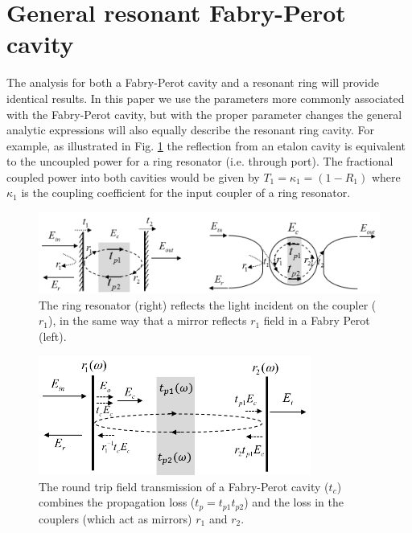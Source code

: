 \documentclass[10pt]{article}
\begin{document}
\section{General resonant Fabry-Perot cavity}
The analysis for both a Fabry-Perot cavity and a resonant ring will provide identical results.  In this paper we use the parameters more commonly associated with the Fabry-Perot cavity, but with the proper parameter changes the general analytic expressions will also equally describe the resonant ring cavity. For example, as illustrated in Fig. \ref{fig:resonator}  the reflection from an etalon cavity is equivalent to the uncoupled power for a ring resonator (i.e. through port).   The fractional coupled power into both cavities would be given by $T_1 = \kappa_1=(1-R_1)$  where $\kappa_1$ is the coupling coefficient for the input coupler of a ring resonator.


\begin{figure}[htbp]
\centering\includegraphics[width=1.0\textwidth]{figures/resonator_v4}
\caption{
The ring resonator (right) reflects the light incident on the coupler ($r_1$), in the same way that a  mirror reflects $r_1$ field in a Fabry Perot (left).
}
\label{fig:resonator}
\end{figure}


\begin{figure}[htbp]
\centering\includegraphics[width=0.8\textwidth]{figures/fp_v6}
\caption{
The round trip field transmission of a Fabry-Perot cavity ($t_c$) combines the propagation loss ($t_p =  t_{p1}t_{p2}$) and the loss in the couplers (which act as mirrors) $r_1$ and $r_2$. 
}
\label{fig:fp}
\end{figure}
\end{document}
